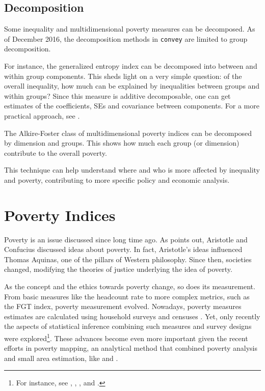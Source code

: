 \documentclass[
]{book}
\begin{document}
\hypertarget{decomposition}{%
\section{Decomposition}\label{decomposition}}

Some inequality and multidimensional poverty measures can be decomposed. As of December 2016, the decomposition methods in \texttt{convey} are limited to group decomposition.

For instance, the generalized entropy index can be decomposed into between and within group components. This sheds light on a very simple question: of the overall inequality, how much can be explained by inequalities between groups and within groups? Since this measure is additive decomposable, one can get estimates of the coefficients, SEs and covariance between components. For a more practical approach, see \autocite{lima2013}.

The Alkire-Foster class of multidimensional poverty indices can be decomposed by dimension and groups. This shows how much each group (or dimension) contribute to the overall poverty.

This technique can help understand where and who is more affected by inequality and poverty, contributing to more specific policy and economic analysis.

\hypertarget{poverty}{%
\chapter{Poverty Indices}\label{poverty}}

Poverty is an issue discussed since long time ago. As \textcite{ravallion2016} points out, Aristotle and Confucius discussed ideas about poverty. In fact, Aristotle's ideas influenced Thomas Aquinas, one of the pillars of Western philosophy. Since then, societies changed, modifying the theories of justice underlying the idea of poverty.

As the concept and the ethics towards poverty change, so does its measurement. From basic measures like the headcount rate to more complex metrics, such as the FGT index, poverty measurement evolved. Nowadays, poverty measures estimates are calculated using household surveys and censuses \autocite{deaton1997}. Yet, only recently the aspects of statistical inference combining such measures and survey designs were explored\footnote{For instance, see \textcite{deville1999}, \textcite{berger2003}, \textcite{bhat2007}, and \textcite{osier2009}.}. These advances become even more important given the recent efforts in poverty mapping, an analytical method that combined poverty analysis and small area estimation, like \textcite{elbers2003} and \textcite{bedi2007}.
\end{document}
